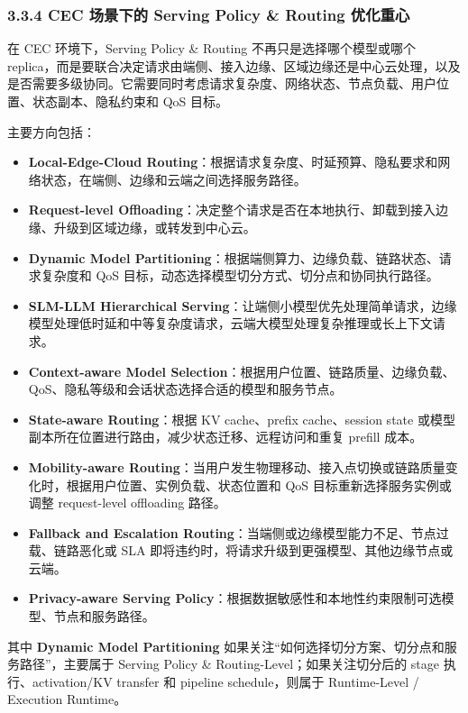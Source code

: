 \documentclass[a4paper,10pt]{ctexart}
\begin{document}
\subsubsection*{3.3.4 CEC 场景下的 Serving Policy \& Routing 优化重心}



在 CEC 环境下，Serving Policy \& Routing 不再只是选择哪个模型或哪个 replica，而是要联合决定请求由端侧、接入边缘、区域边缘还是中心云处理，以及是否需要多级协同。它需要同时考虑请求复杂度、网络状态、节点负载、用户位置、状态副本、隐私约束和 QoS 目标。




主要方向包括：




\begin{itemize}
\item \textbf{Local-Edge-Cloud Routing}：根据请求复杂度、时延预算、隐私要求和网络状态，在端侧、边缘和云端之间选择服务路径。

\item \textbf{Request-level Offloading}：决定整个请求是否在本地执行、卸载到接入边缘、升级到区域边缘，或转发到中心云。

\item \textbf{Dynamic Model Partitioning}：根据端侧算力、边缘负载、链路状态、请求复杂度和 QoS 目标，动态选择模型切分方式、切分点和协同执行路径。

\item \textbf{SLM-LLM Hierarchical Serving}：让端侧小模型优先处理简单请求，边缘模型处理低时延和中等复杂度请求，云端大模型处理复杂推理或长上下文请求。

\item \textbf{Context-aware Model Selection}：根据用户位置、链路质量、边缘负载、QoS、隐私等级和会话状态选择合适的模型和服务节点。

\item \textbf{State-aware Routing}：根据 KV cache、prefix cache、session state 或模型副本所在位置进行路由，减少状态迁移、远程访问和重复 prefill 成本。

\item \textbf{Mobility-aware Routing}：当用户发生物理移动、接入点切换或链路质量变化时，根据用户位置、实例负载、状态位置和 QoS 目标重新选择服务实例或调整 request-level offloading 路径。

\item \textbf{Fallback and Escalation Routing}：当端侧或边缘模型能力不足、节点过载、链路恶化或 SLA 即将违约时，将请求升级到更强模型、其他边缘节点或云端。

\item \textbf{Privacy-aware Serving Policy}：根据数据敏感性和本地性约束限制可选模型、节点和服务路径。



\end{itemize}
其中 \textbf{Dynamic Model Partitioning} 如果关注“如何选择切分方案、切分点和服务路径”，主要属于 Serving Policy \& Routing-Level；如果关注切分后的 stage 执行、activation/KV transfer 和 pipeline schedule，则属于 Runtime-Level / Execution Runtime。
\end{document}

